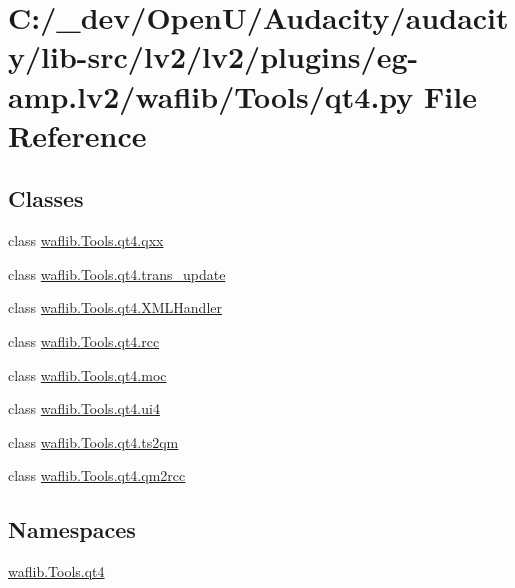 \hypertarget{lv2_2plugins_2eg-amp_8lv2_2waflib_2_tools_2qt4_8py}{}\section{C\+:/\+\_\+dev/\+Open\+U/\+Audacity/audacity/lib-\/src/lv2/lv2/plugins/eg-\/amp.lv2/waflib/\+Tools/qt4.py File Reference}
\label{lv2_2plugins_2eg-amp_8lv2_2waflib_2_tools_2qt4_8py}
\subsection*{Classes}
\begin{DoxyCompactItemize}
\item 
class \hyperlink{classwaflib_1_1_tools_1_1qt4_1_1qxx}{waflib.\+Tools.\+qt4.\+qxx}
\item 
class \hyperlink{classwaflib_1_1_tools_1_1qt4_1_1trans__update}{waflib.\+Tools.\+qt4.\+trans\+\_\+update}
\item 
class \hyperlink{classwaflib_1_1_tools_1_1qt4_1_1_x_m_l_handler}{waflib.\+Tools.\+qt4.\+X\+M\+L\+Handler}
\item 
class \hyperlink{classwaflib_1_1_tools_1_1qt4_1_1rcc}{waflib.\+Tools.\+qt4.\+rcc}
\item 
class \hyperlink{classwaflib_1_1_tools_1_1qt4_1_1moc}{waflib.\+Tools.\+qt4.\+moc}
\item 
class \hyperlink{classwaflib_1_1_tools_1_1qt4_1_1ui4}{waflib.\+Tools.\+qt4.\+ui4}
\item 
class \hyperlink{classwaflib_1_1_tools_1_1qt4_1_1ts2qm}{waflib.\+Tools.\+qt4.\+ts2qm}
\item 
class \hyperlink{classwaflib_1_1_tools_1_1qt4_1_1qm2rcc}{waflib.\+Tools.\+qt4.\+qm2rcc}
\end{DoxyCompactItemize}
\subsection*{Namespaces}
\begin{DoxyCompactItemize}
\item 
 \hyperlink{namespacewaflib_1_1_tools_1_1qt4}{waflib.\+Tools.\+qt4}
\end{DoxyCompactItemize}
